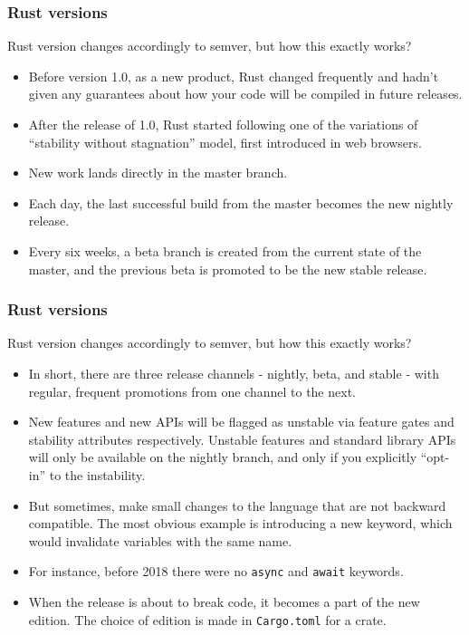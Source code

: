 \documentclass[aspectratio=1610,t]{beamer}
\begin{document}
\begin{frame}[fragile]
\frametitle{Rust versions}
Rust version changes accordingly to semver, but how this exactly works?

\begin{itemize}
    \item<1-> Before version 1.0, as a new product, Rust changed frequently and hadn't given any guarantees about how your code will be compiled in future releases.
    \item<2-> After the release of 1.0, Rust started following one of the variations of ``stability without stagnation'' model, first introduced in web browsers.
    \item<3-> New work lands directly in the master branch.
    \item<4-> Each day, the last successful build from the master becomes the new nightly release.
    \item<5-> Every six weeks, a beta branch is created from the current state of the master, and the previous beta is promoted to be the new stable release.
\end{itemize}
\end{frame}


\begin{frame}[fragile]
\frametitle{Rust versions}
Rust version changes accordingly to semver, but how this exactly works?

\begin{itemize}
    \item<1-> In short, there are three release channels - nightly, beta, and stable - with regular, frequent promotions from one channel to the next.
    \item<2-> New features and new APIs will be flagged as unstable via feature gates and stability attributes respectively. Unstable features and standard library APIs will only be available on the nightly branch, and only if you explicitly ``opt-in'' to the instability.
    \item<3-> But sometimes, make small changes to the language that are not backward compatible. The most obvious example is introducing a new keyword, which would invalidate variables with the same name.
    \item<4-> For instance, before 2018 there were no \texttt{async} and \texttt{await} keywords.
    \item<5-> When the release is about to break code, it becomes a part of the new edition. The choice of edition is made in \texttt{Cargo.toml} for a crate.
\end{itemize}
\end{frame}
\end{document}

